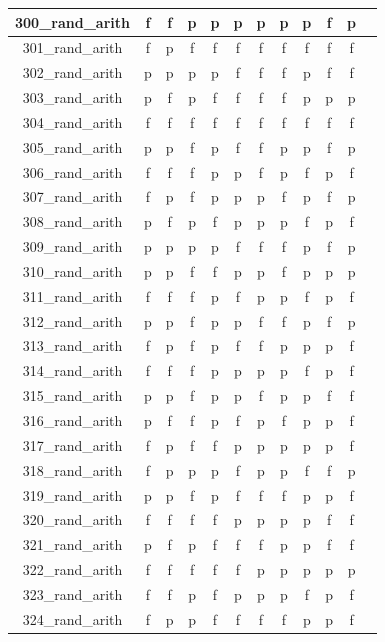 \documentclass[
fancyheadings, %
%
%
]{stsreprt}
\begin{document}
\begin{longtable}{|c|c|c|c|c|c|c|c|c|c|c|c|}
\hline
300\_rand\_arith & f & f & p & p & p & p & p & p & f & p \\
\hline
301\_rand\_arith & f & p & f & f & f & f & f & f & f & f \\
\hline
302\_rand\_arith & p & p & p & p & f & f & f & p & f & f \\
\hline
303\_rand\_arith & p & f & p & f & f & f & f & p & p & p \\
\hline
304\_rand\_arith  & f & f & f & f & f & f & f & f & f & f \\
\hline
305\_rand\_arith & p & p & f & p & f & f & p & p & f & p \\
\hline
306\_rand\_arith & f & f & f & p & p & f & p & f & p & f \\
\hline
307\_rand\_arith & f & p & f & p & p & p & f & p & f & p \\
\hline
308\_rand\_arith & p & f & p & f & p & p & p & f & p & f \\
\hline
309\_rand\_arith & p & p & p & p & f & f & f & p & f & p \\
\hline
310\_rand\_arith & p & p & f & f & p & p & f & p & p & p \\
\hline
311\_rand\_arith & f & f & f & p & f & p & p & f & p & f \\
\hline
312\_rand\_arith & p & p & f & p & p & f & f & p & f & p \\
\hline
313\_rand\_arith & f & p & f & p & f & f & p & p & p & f \\
\hline
314\_rand\_arith & f & f & f & p & p & p & p & f & p & f \\
\hline
315\_rand\_arith & p & p & f & p & p & f & p & p & f & f \\
\hline
316\_rand\_arith & p & f & f & p & f & p & f & p & p & f \\
\hline
317\_rand\_arith & f & p & f & f & p & p & p & p & p & f \\
\hline
318\_rand\_arith & f & p & p & p & f & p & p & f & f & p \\
\hline
319\_rand\_arith & p & p & f & p & f & f & f & p & p & f \\
\hline
320\_rand\_arith & f & f & f & f & p & p & p & p & f & f \\
\hline
321\_rand\_arith & p & f & p & f & f & f & p & p & f & f \\
\hline
322\_rand\_arith & f & f & f & f & f & p & p & p & p & p \\
\hline
323\_rand\_arith & f & f & p & f & p & p & p & f & p & f \\
\hline
324\_rand\_arith & f & p & p & f & f & f & f & p & p & f \\

\end{longtable}
\end{document}
